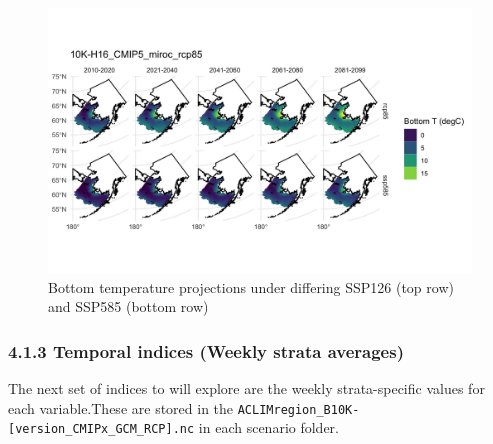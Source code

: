 \documentclass[
]{article}
\begin{document}
\begin{figure}
\centering
\includegraphics{Figs/mn_BT.jpg}
\caption{Bottom temperature projections under differing SSP126 (top row)
and SSP585 (bottom row)}
\end{figure}

\hypertarget{temporal-indices-weekly-strata-averages}{%
\subsubsection{4.1.3 Temporal indices (Weekly strata
averages)}\label{temporal-indices-weekly-strata-averages}}

The next set of indices to will explore are the weekly strata-specific
values for each variable.These are stored in the
\texttt{ACLIMregion\_B10K-{[}version\_CMIPx\_GCM\_RCP{]}.nc} in each
scenario folder.
\end{document}
